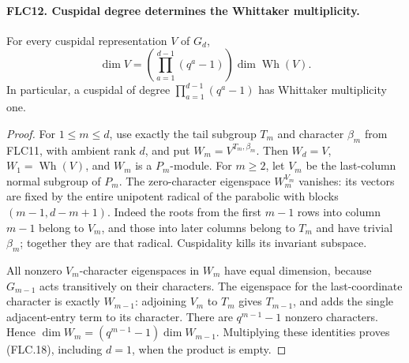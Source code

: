 \paragraph{FLC12. Cuspidal degree determines the Whittaker multiplicity.}
\label{claim:FLC12}
For every cuspidal representation $V$ of $G_d$,
\[
 \dim V=\left(\prod_{a=1}^{d-1}(q^a-1)\right)
                         \dim\operatorname{Wh}(V).
 \tag{FLC.18}
\]
In particular, a cuspidal of degree
$\prod_{a=1}^{d-1}(q^a-1)$ has Whittaker multiplicity one.
\begin{proof}
For $1\le m\le d$, use exactly the tail subgroup $T_m$ and
character $\beta_m$ from FLC11, with ambient rank $d$,
and put $W_m=V^{T_m,\beta_m}$.
Then $W_d=V$, $W_1=\operatorname{Wh}(V)$, and $W_m$ is a
$P_m$-module.  For $m\ge2$, let $V_m$ be the last-column
normal subgroup of $P_m$.
The zero-character eigenspace $W_m^{V_m}$ vanishes: its
vectors are fixed by the entire unipotent radical of the
parabolic with blocks $(m-1,d-m+1)$.
Indeed the roots from the first $m-1$ rows into column $m-1$
belong to $V_m$, and those into later columns belong to $T_m$
and have trivial $\beta_m$; together they are that radical.
Cuspidality kills its invariant subspace.

All nonzero $V_m$-character eigenspaces in $W_m$ have equal
dimension, because $G_{m-1}$ acts transitively on their
characters.  The eigenspace for the last-coordinate character
is exactly $W_{m-1}$: adjoining $V_m$ to $T_m$ gives
$T_{m-1}$, and adds the single adjacent-entry term to its
character.  There are $q^{m-1}-1$ nonzero characters.  Hence
$\dim W_m=(q^{m-1}-1)\dim W_{m-1}$.
Multiplying these identities proves (FLC.18), including
$d=1$, when the product is empty.
\end{proof}

